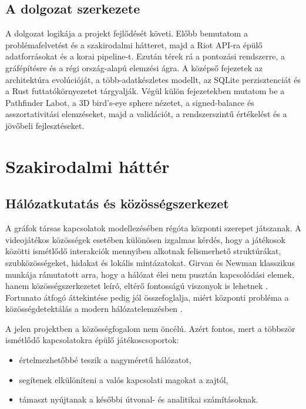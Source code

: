 \documentclass[a4paper,12pt]{report}
\begin{document}
\section{A dolgozat szerkezete}

A dolgozat logikája a projekt fejlődését követi. Előbb bemutatom a problémafelvetést és a szakirodalmi hátteret, majd a Riot API-ra épülő adatforrásokat és a korai pipeline-t. Ezután térek rá a pontozási rendszerre, a gráfépítésre és a régi ország-alapú elemzési ágra. A középső fejezetek az architektúra evolúcióját, a több-adatkészletes modellt, az SQLite perzisztenciát és a Rust futtatókörnyezetet tárgyalják. Végül külön fejezetekben mutatom be a Pathfinder Labot, a 3D bird's-eye sphere nézetet, a signed-balance és asszortativitási elemzéseket, majd a validációt, a rendszerszintű értékelést és a jövőbeli fejlesztéseket.

\chapter{Szakirodalmi háttér}

\section{Hálózatkutatás és közösségszerkezet}

A gráfok társas kapcsolatok modellezésében régóta központi szerepet játszanak. A videojátékos közösségek esetében különösen izgalmas kérdés, hogy a játékosok közötti ismétlődő interakciók mennyiben alkotnak felismerhető struktúrákat, szubközösségeket, hidakat és lokális mintázatokat. Girvan és Newman klasszikus munkája rámutatott arra, hogy a hálózat élei nem pusztán kapcsolódási elemek, hanem közösségszerkezetet leíró, eltérő fontosságú viszonyok is lehetnek \cite{girvannewman}. Fortunato átfogó áttekintése pedig jól összefoglalja, miért központi probléma a közösségdetektálás a modern hálózatelemzésben \cite{fortunato2010}.

A jelen projektben a közösségfogalom nem öncélú. Azért fontos, mert a többször ismétlődő kapcsolatokra épülő játékoscsoportok:

\begin{itemize}
    \item értelmezhetőbbé teszik a nagyméretű hálózatot,
    \item segítenek elkülöníteni a valós kapcsolati magokat a zajtól,
    \item támaszt nyújtanak a későbbi útvonal- és analitikai számításoknak.
\end{itemize}
\end{document}
